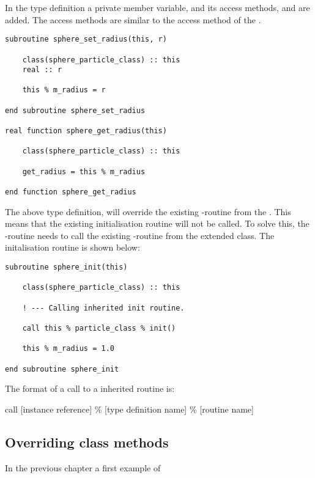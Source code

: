 In the type definition a private member variable,  and its access methods,  and  are added. The access methods are similar to the access method of the .

\begin{lstlisting}
subroutine sphere_set_radius(this, r)

    class(sphere_particle_class) :: this
    real :: r

    this % m_radius = r

end subroutine sphere_set_radius

real function sphere_get_radius(this)

    class(sphere_particle_class) :: this

    get_radius = this % m_radius

end function sphere_get_radius
\end{lstlisting}

The above type definition, will override the existing -routine from the . This means that the existing initialisation routine will not be called. To solve this, the -routine needs to call the existing -routine from the extended class. The  initalisation routine is shown below:

\begin{lstlisting}
subroutine sphere_init(this)

    class(sphere_particle_class) :: this
    
    ! --- Calling inherited init routine.

    call this % particle_class % init() 

    this % m_radius = 1.0

end subroutine sphere_init
\end{lstlisting}

The format of a call to a inherited routine is:

\begin{fsyntax}
call [instance reference] \% [type definition name] \% [routine name]
\end{fsyntax}

\subsection{Overriding class methods}

In the previous chapter a first example of 






























